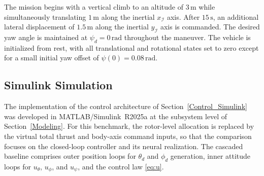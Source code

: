 \documentclass[conference]{IEEEtran}
\begin{document}
The mission begins with a vertical climb to an altitude of $3\,\mathrm{m}$ while simultaneously translating $1\,\mathrm{m}$ along the inertial $x_{\mathcal{I}}$ axis. After $15\,\mathrm{s}$, an additional lateral displacement of $1.5\,\mathrm{m}$ along the inertial $y_{\mathcal{I}}$ axis is commanded. The desired yaw angle is maintained at $\psi_d=0\,\mathrm{rad}$ throughout the maneuver. The vehicle is initialized from rest, with all translational and rotational states set to zero except for a small initial yaw offset of $\psi(0)=0.08\,\mathrm{rad}$.



\subsection{Simulink Simulation}

The implementation of the control architecture of Section~\ref{Control_Simulink} was developed in MATLAB/Simulink~R2025a at the subsystem level of Section~\ref{Modeling}. For this benchmark, the rotor-level allocation is replaced by the virtual total thrust and body-axis command inputs, so that the comparison focuses on the closed-loop controller and its neural realization. 
The cascaded baseline comprises outer position loops for $\theta_d$ and $\phi_d$ generation, inner attitude loops for $u_\theta$, $u_\phi$, and $u_\psi$, and the control law \eqref{eq:u}. %
\end{document}

